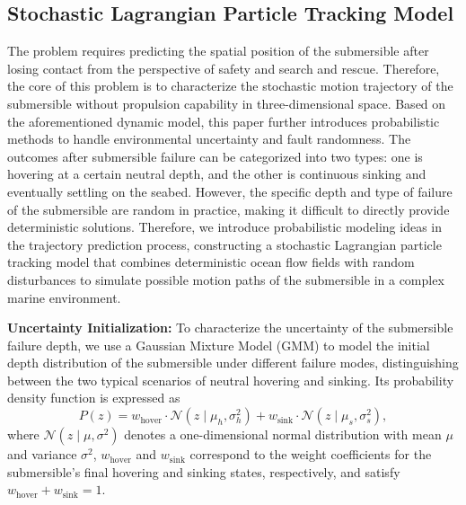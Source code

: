 \documentclass{mcmthesis}
\begin{document}
\subsection{Stochastic Lagrangian Particle Tracking Model}
The problem requires predicting the spatial position of the submersible after losing contact from the perspective of safety and search and rescue.
Therefore, the core of this problem is to characterize the stochastic motion trajectory of the submersible without propulsion capability in three-dimensional space.
Based on the aforementioned dynamic model, this paper further introduces probabilistic methods to handle environmental uncertainty and fault randomness.
The outcomes after submersible failure can be categorized into two types:
one is hovering at a certain neutral depth,
and the other is continuous sinking and eventually settling on the seabed.
However, the specific depth and type of failure of the submersible are random in practice,
making it difficult to directly provide deterministic solutions.
Therefore, we introduce probabilistic modeling ideas in the trajectory prediction process,
constructing a stochastic Lagrangian particle tracking model
that combines deterministic ocean flow fields with random disturbances to simulate possible motion paths of the submersible in a complex marine environment.

\textbf{Uncertainty Initialization:}
To characterize the uncertainty of the submersible failure depth,
we use a Gaussian Mixture Model (GMM)
to model the initial depth distribution of the submersible under different failure modes,
distinguishing between the two typical scenarios of neutral hovering and sinking.
Its probability density function is expressed as
\begin{equation}
P(z)
=
w_{\mathrm{hover}}
\cdot
\mathcal{N}\!\left(z \mid \mu_h, \sigma_h^2 \right)
+
w_{\mathrm{sink}}
\cdot
\mathcal{N}\!\left(z \mid \mu_s, \sigma_s^2 \right),
\end{equation}
where
$\mathcal{N}(z \mid \mu, \sigma^2)$ denotes a one-dimensional normal distribution with mean $\mu$ and variance $\sigma^2$,
$w_{\mathrm{hover}}$ and $w_{\mathrm{sink}}$ correspond to the weight coefficients for the submersible's final hovering and sinking states, respectively,
and satisfy
$w_{\mathrm{hover}} + w_{\mathrm{sink}} = 1$.
\end{document}
